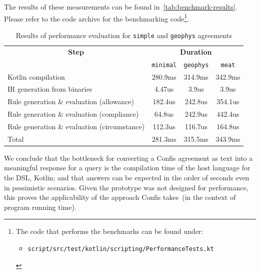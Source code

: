 The results of these measurements can be found in~\autoref{tab:benchmark-results}.
Please refer to the code archive for the benchmarking code\footnote{
    The code that performs the benchmarks can be found under:
    \begin{itemize}
        \item \texttt{script/src/test/kotlin/scripting/PerformanceTests.kt}
    \end{itemize}
}.

\begin{table}[h]
    \centering
    \begin{tabular}{|l|c|c|c|}
        \hline
        \multicolumn{1}{|c|}{\textbf{Step}} & \multicolumn{3}{c|}{\textbf{Duration}} \tabularnewline
        & \texttt{minimal} & \texttt{geophys} & \texttt{meat} \\
        \hline
        \hline
        Kotlin compilation & 280.9ms & 314.9ms & 342.9ms \\
        \hline
        IR generation from binaries & 4.47us & 3.9us & 3.9us \\
        \hline
        Rule generation \& evaluation (allowance)    & 182.4us & 242.8us & 354.1us \\
        \hline
        Rule generation \& evaluation (compliance)   & 64.8us  & 242.9us & 442.4us \\
        \hline
        Rule generation \& evaluation (circumstance) & 112.3us & 116.7us & 164.8us \\
        \hline
        Total & 281.3ms & 315.5ms & 343.9ms \\
        \hline
    \end{tabular}
    \caption{Results of performance evaluation for \texttt{simple} and \texttt{geophys} agreements}
    \label{tab:benchmark-results}
\end{table}

We conclude that the bottleneck for converting a Confis agreement as text into a meaningful response for a query is the compilation time of the host language for the DSL, Kotlin;
and that answers can be expected in the order of seconds even in pessimistic scenarios.
Given the prototype was not designed for performance,
this proves the applicability of the approach Confis takes~(in the context of program running time).


